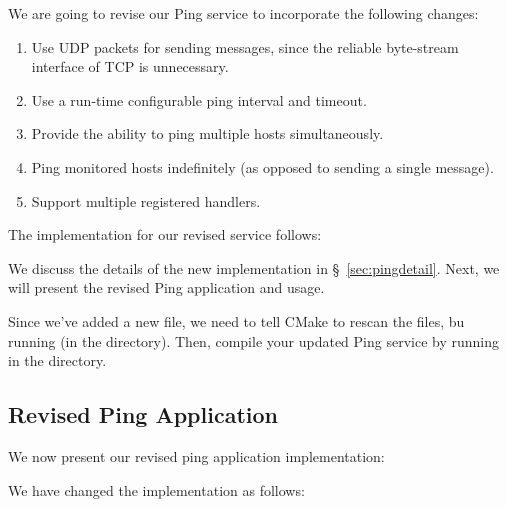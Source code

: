 We are going to revise our Ping service to incorporate the following
changes:

\begin{enumerate}

\item Use UDP packets for sending messages, since the reliable
  byte-stream interface of TCP is unnecessary.

\item Use a run-time configurable ping interval and timeout.

\item Provide the ability to ping multiple hosts simultaneously.

\item Ping monitored hosts indefinitely (as opposed to sending a
  single message).

\item Support multiple registered handlers.

\end{enumerate}

The implementation for our revised service
 follows:


We discuss the details of the new implementation in
\S~\ref{sec:pingdetail}.  Next, we will present the revised Ping
application and usage.

Since we've added a new file, we need to tell CMake to rescan the files,
bu running  (in the 
directory).  Then, compile your updated Ping service by running
 in the  directory.

\subsection{Revised Ping Application}
\label{sec:ping-application}

We now present our revised ping application  implementation:


We have changed the implementation as follows:


